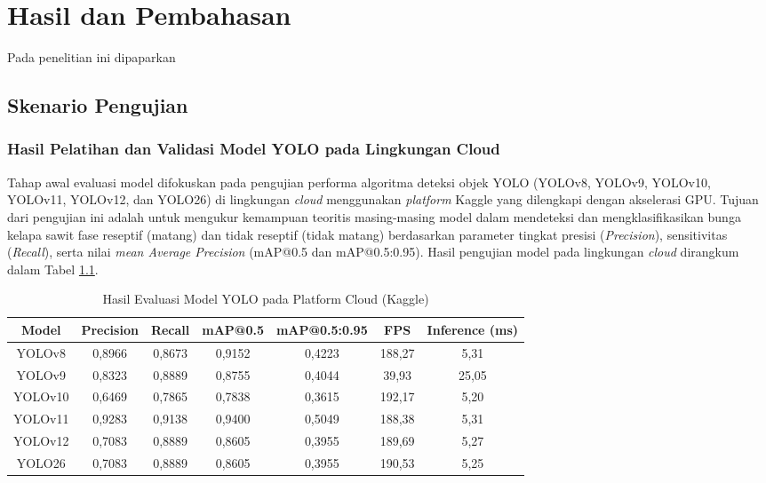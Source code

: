 \chapter{Hasil dan Pembahasan}
\label{chap:hasil-pembahasan}


Pada penelitian ini dipaparkan \lipsum[1][1-5]

\section{Skenario Pengujian}
\label{sec:skenario-pengujian}

\subsection{Hasil Pelatihan dan Validasi Model YOLO pada Lingkungan Cloud}
\label{sec:yolo-cloud}
Tahap awal evaluasi model difokuskan pada pengujian performa algoritma deteksi objek YOLO (YOLOv8, YOLOv9, YOLOv10, YOLOv11, YOLOv12, dan YOLO26) di lingkungan \emph{cloud} menggunakan \emph{platform} Kaggle yang dilengkapi dengan akselerasi GPU. Tujuan dari pengujian ini adalah untuk mengukur kemampuan teoritis masing-masing model dalam mendeteksi dan mengklasifikasikan bunga kelapa sawit fase reseptif (matang) dan tidak reseptif (tidak matang) berdasarkan parameter tingkat presisi (\emph{Precision}), sensitivitas (\emph{Recall}), serta nilai \emph{mean Average Precision} (mAP@0.5 dan mAP@0.5:0.95). Hasil pengujian model pada lingkungan \emph{cloud} dirangkum dalam Tabel \ref{tb:evaluasi-kaggle}.

\begin{table}[H]
  \centering
  \caption{Hasil Evaluasi Model YOLO pada Platform Cloud (Kaggle)}
  \label{tb:evaluasi-kaggle}
  \begin{tabular}{|c|c|c|c|c|c|c|}
    \hline
    \rowcolor[HTML]{C0C0C0}
    \textbf{Model} & \textbf{Precision} & \textbf{Recall} & \textbf{mAP@0.5} & \textbf{mAP@0.5:0.95} & \textbf{FPS} & \textbf{Inference (ms)} \\
    \hline
    YOLOv8  & 0,8966 & 0,8673 & 0,9152 & 0,4223 & 188,27 & 5,31 \\
    YOLOv9  & 0,8323 & 0,8889 & 0,8755 & 0,4044 & 39,93  & 25,05 \\
    YOLOv10 & 0,6469 & 0,7865 & 0,7838 & 0,3615 & 192,17 & 5,20 \\
    YOLOv11 & 0,9283 & 0,9138 & 0,9400 & 0,5049 & 188,38 & 5,31 \\
    YOLOv12 & 0,7083 & 0,8889 & 0,8605 & 0,3955 & 189,69 & 5,27 \\
    YOLO26  & 0,7083 & 0,8889 & 0,8605 & 0,3955 & 190,53 & 5,25 \\
    \hline
  \end{tabular}
\end{table}

